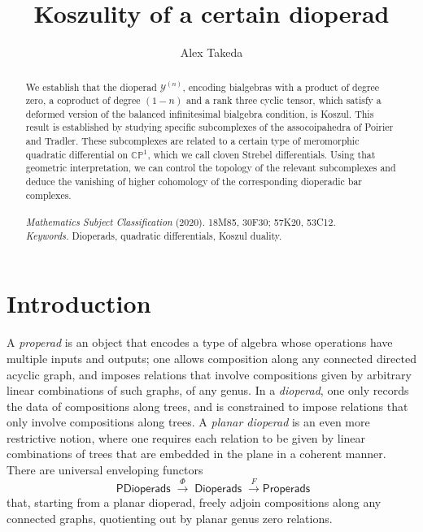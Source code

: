 \documentclass[11pt,a4paper]{amsart}
\title{Koszulity of a certain dioperad}
\author{Alex Takeda}
\newcommand{\scrY}{\mathscr{Y}}
\newcommand{\Diop}{\mathop{\mathsf{Dioperads}}\nolimits}
\newcommand{\PDiop}{\mathop{\mathsf{PDioperads}}\nolimits}
\theoremstyle{definition}
\begin{document}
\newcommand{\Addresses}{{%
  \bigskip
  \footnotesize
  \noindent A.~Takeda, \textsc{Uppsala University, Department of Mathematics, Box 480, 751 05 Uppsala, Sweden}\par\nopagebreak
  \noindent\textit{E-mail address}: \texttt{alex.takeda@math.uu.se}
 }}


\begin{abstract}
    We establish that the dioperad $\scrY^{(n)}$, encoding bialgebras with a product of degree zero, a coproduct of degree $(1-n)$ and a rank three cyclic tensor, which satisfy a deformed version of the balanced infinitesimal bialgebra condition, is Koszul. This result is established by studying specific subcomplexes of the assocoipahedra of Poirier and Tradler. These subcomplexes are related to a certain type of meromorphic quadratic differential on $\mathbb{CP}^1$, which we call cloven Strebel differentials. Using that geometric interpretation, we can control the topology of the relevant subcomplexes and deduce the vanishing of higher cohomology of the corresponding dioperadic bar complexes.
    \\
    \\
    {\it Mathematics Subject Classification} (2020). 18M85, 30F30; 57K20, 53C12. \\
    \emph{Keywords.} Dioperads, quadratic differentials, Koszul duality.
\end{abstract}

\maketitle

\section{Introduction}
\noindent A \emph{properad} is an object that encodes a type of algebra whose operations have multiple inputs and outputs; one allows composition along any connected directed acyclic graph, and imposes relations that involve compositions given by arbitrary linear combinations of such graphs, of any genus. In a \emph{dioperad}, one only records the data of compositions along trees, and is constrained to impose relations that only involve compositions along trees. A \emph{planar dioperad} is an even more restrictive notion, where one requires each relation to be given by linear combinations of trees that are embedded in the plane in a coherent manner. There are universal enveloping functors
\[ \PDiop \xrightarrow{\Phi} \Diop \xrightarrow{F} \mathsf{Properads}\]
that, starting from a planar dioperad, freely adjoin compositions along any connected graphs, quotienting out by planar genus zero relations. 
\end{document}
